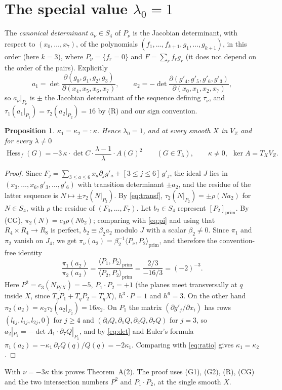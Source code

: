 \documentclass[10pt]{article}
\numberwithin{equation}{section}
\newtheorem{proposition}[theorem]{Proposition}
\theoremstyle{remark}
\newcommand{\VZ}{V_Z}
\newcommand{\Hess}{\operatorname{Hess}}
\begin{document}
\section{The special value \texorpdfstring{$\lambda_0=1$}{lambda0 = 1}}\label{sec:lambda0}
The \emph{canonical determinant} $a_\nu\in S_4$ of $P_\nu$ is the Jacobian determinant, with respect to
$(x_0,\dots,x_7)$, of the polynomials $(f_1,\dots,f_{k+1},g_1,\dots,g_{k+1})$, in this order (here $k=3$), where
$P_\nu=\{f_r=0\}$ and $F=\sum_rf_rg_r$ (it does
not depend on the order of the pairs). Explicitly
\[
a_1=\det\frac{\partial(g_0,g_1,g_2,g_3)}{\partial(x_4,x_5,x_6,x_7)},\qquad
a_2=-\det\frac{\partial(g'_4,g'_5,g'_6,g'_3)}{\partial(x_0,x_1,x_2,x_7)},
\]
so $a_\nu|_{P_\nu}$ is $\pm$ the Jacobian determinant of the sequence defining $\tau_\nu$, and
$\tau_1(a_1|_{P_1})=\tau_2(a_2|_{P_2})=16$ by (R) and our sign convention.

\begin{proposition}\label{prop:lambda0}
$\kappa_1=\kappa_2=:\kappa$. Hence $\lambda_0=1$, and at every smooth $X$ in $\VZ$ and for every $\lambda\neq0$
\begin{equation}\label{eq:hess1}
\Hess_f(G)=-3\,\kappa\cdot\det C\cdot\frac{\lambda-1}{\lambda}\cdot A(G)^2\qquad(G\in T_\lambda),\qquad
\kappa\neq0,\ \ \ker A=T_X\VZ .
\end{equation}
\end{proposition}
\begin{proof}
Since $F_j=\sum_{3\le a\le6}x_a\partial_jg'_a+[3\le j\le6]\,g'_j$, the ideal $J$ lies in
$(x_3,\dots,x_6,g'_3,\dots,g'_6)$ with transition determinant $\pm a_2$, and the residue of the latter sequence
is $N\mapsto\pm\tau_2(N|_{P_2})$. By \eqref{eq:transf}, $\tau_2(N|_{P_2})=\pm\rho(Na_2)$ for $N\in S_4$, with
$\rho$ the residue of $(F_0,\dots,F_7)$. Let $b_2\in S_4$ represent $[P_2]_{\mathrm{prim}}$. By (CG),
$\pi_2(N)=c_0\rho(Nb_2)$; comparing with \eqref{eq:pi} and using that $R_4\times R_4\to R_8$ is perfect,
$b_2\equiv\beta_2a_2$ modulo $J$ with a scalar $\beta_2\ne0$. Since $\pi_1$ and $\pi_2$ vanish on $J_4$, we get
$\pi_\nu(a_2)=\beta_2^{-1}\langle P_\nu,P_2\rangle_{\mathrm{prim}}$, and therefore the convention-free identity
\begin{equation}\label{eq:ratio}
\frac{\pi_1(a_2)}{\pi_2(a_2)}=\frac{\langle P_1,P_2\rangle_{\mathrm{prim}}}{\langle P_2,P_2\rangle_{\mathrm{prim}}}
=\frac{2/3}{-16/3}=(-2)^{-3}.
\end{equation}
Here $P^2=c_3(N_{P/X})=-5$, $P_1\cdot P_2=+1$ (the planes meet transversally at $q$ inside $X$, since
$T_qP_1+T_qP_2=T_qX$), $h^3\cdot P=1$ and $h^6=3$. On the other hand $\pi_2(a_2)=\kappa_2\tau_2(a_2|_{P_2})=
16\kappa_2$. On $P_1$ the matrix $(\partial g'_j/\partial x_i)$ has rows $(l_{0j},l_{1j},l_{2j},0)$ for $j\ge4$
and $(\partial_0Q,\partial_1Q,\partial_2Q,\partial_7Q)$ for $j=3$, so
$a_2|_{P_1}=-\det\Lambda_1\cdot\partial_7Q|_{P_1}$, and by \eqref{eq:det} and Euler's formula
$\pi_1(a_2)=-\kappa_1\,\partial_7Q(q)/Q(q)=-2\kappa_1$. Comparing with \eqref{eq:ratio} gives
$\kappa_1=\kappa_2$.
\end{proof}
With $\nu=-3\kappa$ this proves Theorem~A(2). The proof uses (G1), (G2), (R), (CG) and the two intersection
numbers $P^2$ and $P_1\cdot P_2$, at the single smooth $X$.
\end{document}
